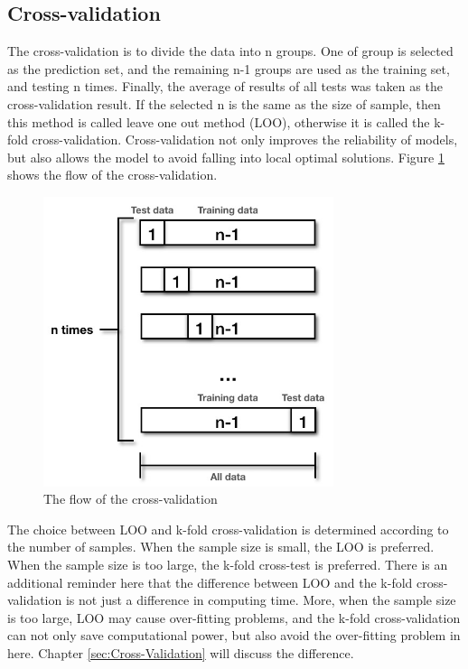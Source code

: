 \documentclass[a4paper,12pt,titlepage]{article} %
\numberwithin{equation}{section}  %
\begin{document}
	\subsection{Cross-validation}
	\label{cross-validation}
	The cross-validation is to divide the data into n groups. One of group is selected as the prediction set, and the remaining n-1 groups are used as the training set, and testing n times. Finally, the average of results of all tests was taken as the cross-validation result. If the selected n is the same as the size of sample, then this method is called leave one out method (LOO), otherwise it is called the k-fold cross-validation. Cross-validation not only improves the reliability of models, but also allows the model to avoid falling into local optimal solutions. Figure \ref{fig:cross-validation} shows the flow of the cross-validation.
	\begin{figure}[h]    %
		\centering           %
		\includegraphics[width=8.5cm, angle=0]{cross-validation.png}  %
		\vspace*{-0.25cm}    %
		\caption{The flow of the cross-validation}          %
		\label{fig:cross-validation}               %
	\end{figure}                        %
	
	The choice between LOO and k-fold cross-validation is determined according to the number of samples. When the sample size is small, the LOO is preferred. When the sample size is too large, the k-fold cross-test is preferred. There is an additional reminder here that the difference between LOO and the k-fold cross-validation is not just a difference in computing time. More, when the sample size is too large, LOO may cause over-fitting problems, and the k-fold cross-validation can not only save computational power, but also avoid the over-fitting problem in here. Chapter \ref{sec:Cross-Validation} will discuss the difference.
	
\end{document}
